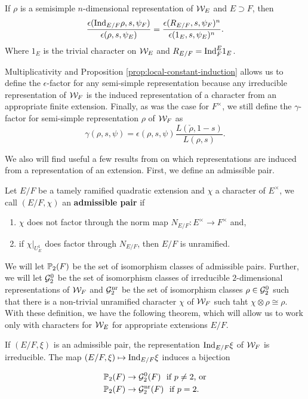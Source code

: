 \begin{prop}\label{prop:local-constant-induction}
  If $\rho$ is a semisimple $n$-dimensional representation of $\mathcal{W}_E$ and $E\supset F$, then
  \[\frac{\epsilon(\textrm{Ind}_{E/F} \rho, s, \psi_F)}{\epsilon(\rho,s,\psi_E)} = \frac{\epsilon(R_{E/F},s,\psi_F)^n}{\epsilon(1_E,s,\psi_E)^n}.\]
  Where $1_E$ is the trivial character on $\mathcal{W}_E$ and $R_{E/F} = \textrm{Ind}^E_F 1_E$.
\end{prop}
Multiplicativity and Proposition \ref{prop:local-constant-induction} allows us to define the $\epsilon$-factor for any semi-simple representation because any irreducible representation of $\mathcal{W}_F$ is the induced representation of a character from an appropriate finite extension.
Finally, as was the case for $F^\times$, we still define the $\gamma$-factor for semi-simple representation $\rho$ of $\mathcal{W}_F$ as
\[\gamma(\rho, s ,\psi) = \epsilon(\rho, s, \psi) \frac{L(\check{\rho},1-s)}{L(\rho,s)}.\]

We also will find useful a few results from \cite{Bushnell2006} on which representations are induced from a representation of an extension.
First, we define an admissible pair.
\begin{defn}
  Let $E/F$ be a tamely ramified quadratic extension and $\chi$ a character of $E^\times$, we call $(E/F, \chi)$ an \textbf{admissible pair} if
  \begin{enumerate}
  \item $\chi$ does not factor through the norm map $N_{E/F}: E^\times \to F^\times$ and,
    \item if $\chi|_{U_E^1}$ does factor through $N_{E/F}$, then $E/F$ is unramified.
  \end{enumerate}
\end{defn}

We will let $\mathbb{P}_2(F)$ be the set of isomorphism classes of admissible pairs. Further, we will let $\mathcal{G}_2^0$ be the set of isomorphism classes of irreducible $2$-dimensional representations of $\mathcal{W}_F$ and $\mathcal{G}_2^{\textrm{nr}}$ be the set of isomorphism classes $\rho \in \mathcal{G}_2^0$ such that there is a non-trivial unramified character $\chi$ of $\mathcal{W}_F$ such taht $\chi \otimes \rho \cong \rho$.
With these definition, we have the following theorem, which will allow us to work only with characters for $\mathcal{W}_E$ for appropriate extensions $E/F$.
\begin{theorem}
  If $(E/F, \xi)$ is an admissible pair, the representation $\textrm{Ind}_{E/F} \xi$ of $\mathcal{W}_F$ is irreducible. The map $(E/F, \xi) \mapsto \textrm{Ind}_{E/F} \xi$ induces a bijection

  \begin{align*}
    \mathbb{P}_2(F) &\to \mathcal{G}_2^0(F) \,\,  \text{ if } p \neq 2 \text{, or} \\
    \mathbb{P}_2(F) &\to \mathcal{G}_2^{\textrm{nr}}(F) \,\, \text{ if } p = 2.
  \end{align*}
\end{theorem} 

